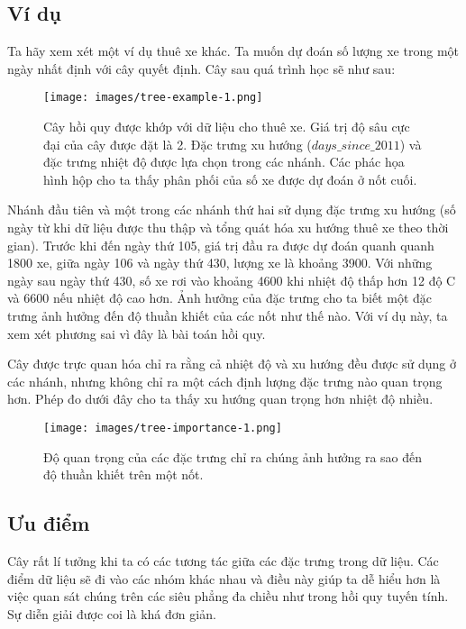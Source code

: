 \subsection{Ví dụ}
Ta hãy xem xét một ví dụ thuê xe khác. Ta muốn dự đoán số lượng xe trong một ngày nhất định với cây quyết định. Cây sau quá trình học sẽ như sau:

\begin{figure*}[hbt!]
	\centering
	\texttt{[image: images/tree-example-1.png]}
	\label{fig:4_3_17}
	\caption{Cây hồi quy được khớp với dữ liệu cho thuê xe. Giá trị độ sâu cực đại của cây được đặt là 2. Đặc trưng xu hướng ($days\_since\_2011$) và đặc trưng nhiệt độ được lựa chọn trong các nhánh. Các phác họa hình hộp cho ta thấy phân phối của số xe được dự đoán ở nốt cuối.}
\end{figure*}

Nhánh đầu tiên và một trong các nhánh thứ hai sử dụng đặc trưng xu hướng (số ngày từ khi dữ liệu được thu thập và tổng quát hóa xu hướng thuê xe theo thời gian). Trước khi đến ngày thứ 105, giá trị đầu ra được dự đoán quanh quanh 1800 xe, giữa ngày 106 và ngày thứ 430, lượng xe là khoảng 3900. Với những ngày sau ngày thứ 430, số xe rơi vào khoảng 4600 khi nhiệt độ thấp hơn 12 độ C và 6600 nếu nhiệt độ cao hơn. Ảnh hưởng của đặc trưng cho ta biết một đặc trưng ảnh hưởng đến độ thuần khiết của các nốt như thế nào. Với ví dụ này, ta xem xét phương sai vì đây là bài toán hồi quy.

Cây được trực quan hóa chỉ ra rằng cả nhiệt độ và xu hướng đều được sử dụng ở các nhánh, nhưng không chỉ ra một cách định lượng đặc trưng nào quan trọng hơn. Phép đo dưới đây cho ta thấy xu hướng quan trọng hơn nhiệt độ nhiều.

\begin{figure*}[h!]
	\centering
	\texttt{[image: images/tree-importance-1.png]}
	\label{fig:4_3_18}
	\caption{Độ quan trọng của các đặc trưng chỉ ra chúng ảnh hưởng ra sao đến độ thuần khiết trên một nốt.}
	
\end{figure*}

\subsection{Ưu điểm}
Cây rất lí tưởng khi ta có các tương tác giữa các đặc trưng trong dữ liệu. Các điểm dữ liệu sẽ đi vào các nhóm khác nhau và điều này giúp ta dễ hiểu hơn là việc quan sát chúng trên các siêu phẳng đa chiều như trong hồi quy tuyến tính. Sự diễn giải được coi là khá đơn giản.

